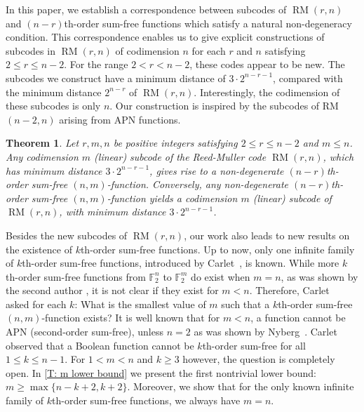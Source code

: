\documentclass[12pt]{article}
\newtheorem{thm}{Theorem}[section]
\theoremstyle{definition}
\newcommand{\Fpnv}{\mathbb{F}_2^n}
\newcommand{\Fpmv}{\mathbb{F}_2^m}
\DeclareMathOperator{\RM}{RM}
\begin{document}
In this paper, we establish a correspondence between subcodes of $\RM(r,n)$ and $(n-r)$th-order sum-free functions which satisfy a natural non-degeneracy condition. This correspondence enables us to give explicit constructions of subcodes in $\RM(r,n)$ of codimension $n$ for each $r$ and $n$ satisfying $2 \leq r \leq n-2$. For the range $2 < r < n-2$, these codes appear to be new. The subcodes we construct have a minimum distance of $3\cdot 2^{n-r-1}$, compared with the minimum distance $2^{n-r}$ of $\RM(r,n)$. Interestingly, the codimension of these subcodes is only $n$. Our construction is inspired by the subcodes of RM$(n-2, n)$ arising from APN functions. 

\begin{thm}\label{T: Equivalence}
    Let $r,m, n$ be positive integers satisfying $2 \leq r \leq n-2$ and $m \leq n$. Any codimension $m$ (linear) subcode of the Reed-Muller code $\RM(r,n)$, which has minimum distance $3\cdot 2^{n-r-1}$, gives rise to a non-degenerate $(n-r)$th-order sum-free $(n, m)$-function. Conversely, any  non-degenerate $(n-r)$th-order sum-free $(n, m)$-function yields a codimension $m$ (linear) subcode of $\RM(r,n)$, with minimum distance $3 \cdot 2^{n-r-1}$.
\end{thm}

Besides the new subcodes of $\RM(r,n)$, our work also leads to new results on the existence of $k$th-order sum-free functions. Up to now, only one infinite family of $k$th-order sum-free functions, introduced by Carlet~\cite{carlet2025tDegree,carlet2025generalizations}, is known.  While more $k$th-order sum-free functions from $\Fpnv$ to $\Fpmv$ do exist when $m = n$, as was shown by the second author \cite{kaspers2026WCC}, it is not clear if they exist for $m <n$. Therefore, Carlet~\cite{carlet2025generalizations} asked for each $k$: What is the smallest value of $m$ such that a $k$th-order sum-free $(n,m)$-function exists? It is well known that for $m<n$, a function cannot be APN (second-order sum-free), unless $n = 2$ as was shown by Nyberg~\cite{eurocrypt-1993-2628}. Carlet~\cite{carlet2025generalizations} observed that a Boolean function cannot be $k$th-order sum-free for all $1\le k\le n-1$. For $1<m<n$ and $k \ge 3$ however, the question is completely open.  In \cref{T: m lower bound} we present the first nontrivial lower bound: $m\geq \max\{n-k+2,k+2\}$. Moreover, we show that for the only known infinite family of $k$th-order sum-free functions, we always have $m=n$.
\end{document}
